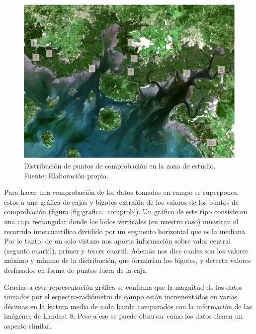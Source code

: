 \begin{figure}
	\centering
	\includegraphics[width=0.8\linewidth]{./Imagenes/puntos_comprob.eps}
	\caption[Distribución de puntos]{Distribución de puntos de comprobación en la zona de estudio. Fuente: Elaboración propia.}
	\label{fig:dist_puntos}
\end{figure}

Para hacer una comprobación de los datos tomados en campo se superponen estos a una gráfica de cajas y bigotes extraída de los valores de los puntos de comprobación (figura \ref{fig:grafica_comprob}). Un gráfico de este tipo consiste en una caja rectangular donde los lados verticales (en nuestro caso) muestran el recorrido intercuartílico dividido por un segmento horizontal que es la mediana. Por lo tanto, de un solo vistazo nos aporta información sobre valor central (segunto cuartil), primer y tercer cuartil. Además nos dice cuales son los valores máximo y mínimo de la distribución, que formarían los bigotes, y detecta valores desfasados en forma de puntos fuera de la caja.\Sep

Gracias a esta representación gráfica se confirma que la magnitud de los datos tomados por el espectro-radiómetro de campo están incrementados en varias décimas en la lectura media de cada banda comparados con la información de las imágenes de Landsat 8. Pese a eso se puede observar como los datos tienen un aspecto similar.


